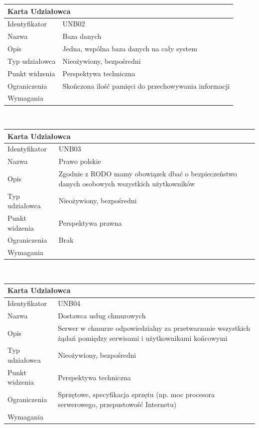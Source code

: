 \documentclass[a4paper,11pt]{report}
\begin{document}
	\begin{tabular}{|p{3cm}|p{11cm}|}
	\hline
	\multicolumn{2}{|l|}{\textbf{Karta Udziałowca}}\\
	\hline
	Identyfikator&UNB02\\
	\hline
	Nazwa&Baza danych\\
	\hline
	Opis&Jedna, wspólna baza danych na cały system\\
	\hline
	Typ udziałowca&Nieożywiony, bezpośredni\\
	\hline
	Punkt widzenia&Perspektywa techniczna\\
	\hline
	Ograniczenia&Skończona ilość pamięci do przechowywania informacji\\
	\hline
	Wymagania&\\
	\hline
	\end{tabular}\\
	\begin{tabular}{|p{3cm}|p{11cm}|}
	\hline
	\multicolumn{2}{|l|}{\textbf{Karta Udziałowca}}\\
	\hline
	Identyfikator&UNB03\\
	\hline
	Nazwa&Prawo polskie\\
	\hline
	Opis&Zgodnie z RODO mamy obowiązek dbać o bezpieczeństwo danych osobowych wszystkich użytkowników\\
	\hline
	Typ udziałowca&Nieożywiony, bezpośredni\\
	\hline
	Punkt widzenia&Perspektywa prawna\\
	\hline
	Ograniczenia&Brak\\
	\hline
	Wymagania&\\
	\hline
	\end{tabular}\\
	\begin{tabular}{|p{3cm}|p{11cm}|}
	\hline
	\multicolumn{2}{|l|}{\textbf{Karta Udziałowca}}\\
	\hline
	Identyfikator&UNB04\\
	\hline
	Nazwa&Dostawca usług chmurowych\\
	\hline
	Opis&Serwer w chmurze odpowiedzialny za przetwarzanie wszystkich żądań pomiędzy serwisami i użytkownikami końcowymi\\
	\hline
	Typ udziałowca&Nieożywiony, bezpośredni\\
	\hline
	Punkt widzenia&Perspektywa techniczna\\
	\hline
	Ograniczenia& Sprzętowe, specyfikacja sprzętu (np. moc procesora serwerowego, przepustowość Internetu)\\
	\hline
	Wymagania&\\
	\hline
	\end{tabular}\\
\end{document}
